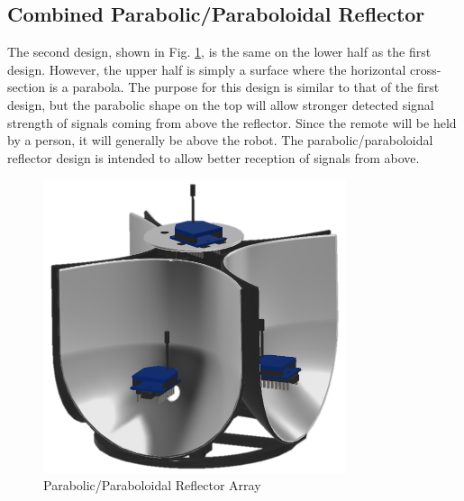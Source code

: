\subsection{Combined Parabolic/Paraboloidal Reflector}\label{subsec:parabolicReflector}
The second design, shown in Fig. \ref{fig:parabolicReflector}, is the same on the lower half as the first design. However, the upper half is simply a surface where the horizontal cross-section is a parabola. The purpose for this design is similar to that of the first design, but the parabolic shape on the top will allow stronger detected signal strength of signals coming from above the reflector. Since the remote will be held by a person, it will generally be above the robot. The parabolic/paraboloidal reflector design is intended to allow better reception of signals from above.
\begin{figure}
    \centering
    \includegraphics[width=3.5in]{figs/img/parabolicReflector.png}
    \caption{Parabolic/Paraboloidal Reflector Array}
    \label{fig:parabolicReflector}
\end{figure}

